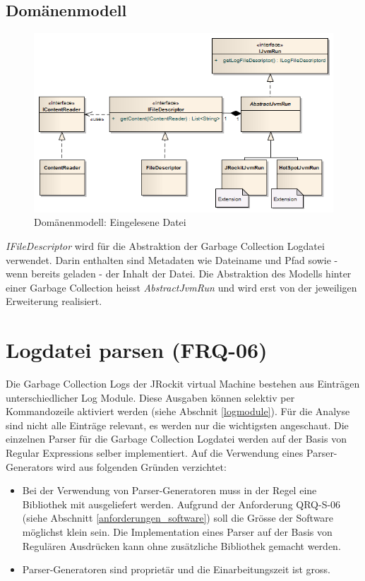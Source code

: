 \subsection{Domänenmodell}\label{logdatei_domainmodel}
 \begin{figure}[H]
  	\centering
    	\includegraphics[width=16cm]{images/core_domain}
        	\caption{Domänenmodell: Eingelesene Datei}
\end{figure}
\textit{IFileDescriptor} wird für die Abstraktion der Garbage Collection Logdatei verwendet. Darin enthalten sind Metadaten wie Dateiname und Pfad sowie - wenn bereits geladen - der Inhalt der Datei. Die Abstraktion des Modells hinter einer Garbage Collection heisst \textit{AbstractJvmRun} und wird erst von der jeweiligen Erweiterung realisiert.

\section{Logdatei parsen (FRQ-06)}
Die Garbage Collection Logs der JRockit virtual Machine bestehen aus Einträgen unterschiedlicher Log Module. Diese Ausgaben können selektiv per Kommandozeile aktiviert werden (siehe Abschnit \ref{logmodule}). Für die Analyse sind nicht alle Einträge relevant, es werden nur die wichtigsten angeschaut. Die einzelnen Parser für die Garbage Collection Logdatei werden auf der Basis von Regular Expressions selber implementiert. Auf die Verwendung eines Parser-Generators wird aus folgenden Gründen verzichtet:
\begin{itemize}
	\item Bei der Verwendung von Parser-Generatoren muss in der Regel eine Bibliothek mit ausgeliefert werden. Aufgrund der Anforderung QRQ-S-06 (siehe Abschnitt \ref{anforderungen_software}) soll die Grösse der Software möglichst klein sein. Die Implementation eines Parser auf der Basis von Regulären Ausdrücken kann ohne zusätzliche Bibliothek gemacht werden.
	\item Parser-Generatoren sind proprietär und die Einarbeitungszeit ist gross.
\end{itemize}


